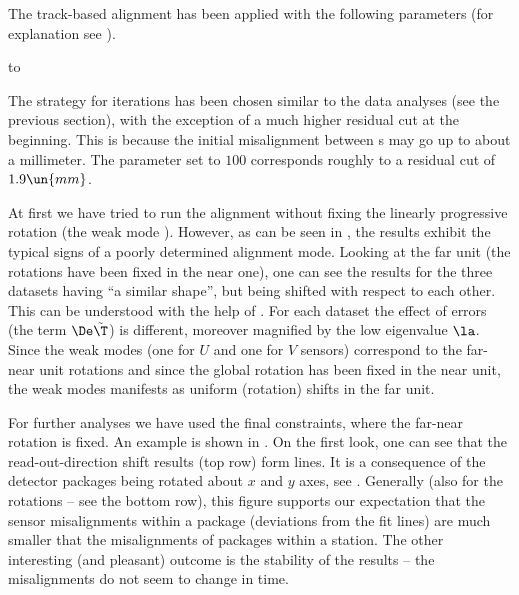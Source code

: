 The track-based alignment has been applied with the following parameters (for explanation see ).

\hbox to

\vskip1mm\noindent The strategy for iterations has been chosen similar to the  data analyses (see the previous section), with the exception of a much higher residual cut at the beginning. This is because the initial misalignment between s may go up to about a millimeter. The  parameter set to $100$ corresponds roughly to a residual cut of $1.9\un{mm}$.

At first we have tried to run the alignment without fixing the linearly progressive rotation (the weak mode ). However, as can be seen in , the results exhibit the typical signs of a poorly determined alignment mode. Looking at the far unit (the rotations have been fixed in the near one), one can see the results for the three datasets having ``a similar shape'', but being shifted with respect to each other. This can be understood with the help of . For each dataset the effect of errors (the term $\De\tilde\T$) is different, moreover magnified by the low eigenvalue $\la$. Since the weak modes (one for $U$ and one for $V$ sensors) correspond to the far-near unit rotations and since the global rotation has been fixed in the near unit, the weak modes manifests as uniform (rotation) shifts in the far unit.

For further analyses we have used the final constraints, where the far-near rotation is fixed. An example is shown in . On the first look, one can see that the read-out-direction shift results (top row) form lines. It is a consequence of the detector packages being rotated about $x$ and $y$ axes, see . Generally (also for the rotations -- see the bottom row), this figure supports our expectation that the sensor misalignments within a package (deviations from the fit lines) are much smaller that the misalignments of  packages within a station. The other interesting (and pleasant) outcome is the stability of the results -- the misalignments do not seem to change in time.

